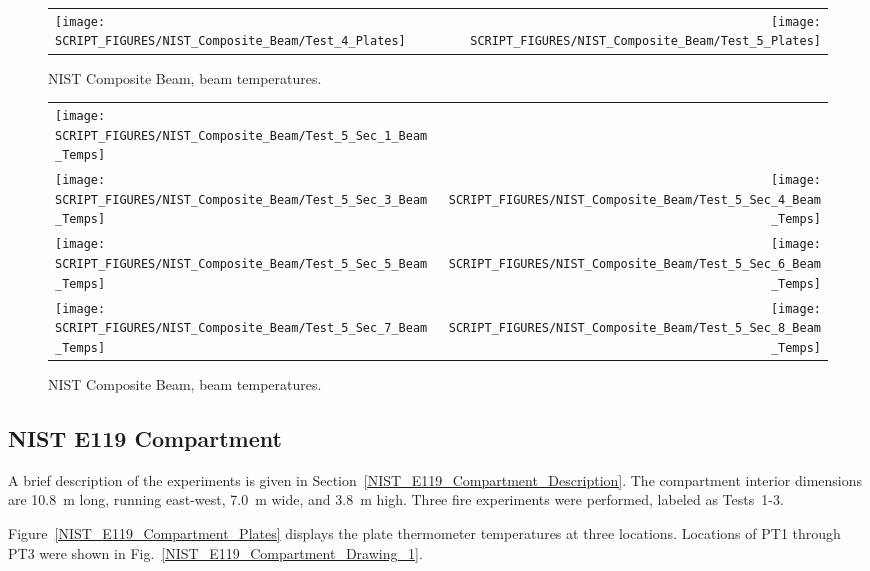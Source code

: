 \begin{figure}[!h]
\begin{tabular*}{\textwidth}{l@{\extracolsep{\fill}}r}
\texttt{[image: SCRIPT\_FIGURES/NIST\_Composite\_Beam/Test\_4\_Plates]} &
\texttt{[image: SCRIPT\_FIGURES/NIST\_Composite\_Beam/Test\_5\_Plates]}
\end{tabular*}
\caption[NIST Composite Beam, beam temperatures]{NIST Composite Beam, beam temperatures.}
\label{NIST_CB_Plates}
\end{figure}

\newpage

\begin{figure}[p]
\begin{tabular*}{\textwidth}{l@{\extracolsep{\fill}}r}
\texttt{[image: SCRIPT\_FIGURES/NIST\_Composite\_Beam/Test\_5\_Sec\_1\_Beam\_Temps]} &
 \\
\texttt{[image: SCRIPT\_FIGURES/NIST\_Composite\_Beam/Test\_5\_Sec\_3\_Beam\_Temps]} &
\texttt{[image: SCRIPT\_FIGURES/NIST\_Composite\_Beam/Test\_5\_Sec\_4\_Beam\_Temps]} \\
\texttt{[image: SCRIPT\_FIGURES/NIST\_Composite\_Beam/Test\_5\_Sec\_5\_Beam\_Temps]} &
\texttt{[image: SCRIPT\_FIGURES/NIST\_Composite\_Beam/Test\_5\_Sec\_6\_Beam\_Temps]} \\
\texttt{[image: SCRIPT\_FIGURES/NIST\_Composite\_Beam/Test\_5\_Sec\_7\_Beam\_Temps]} &
\texttt{[image: SCRIPT\_FIGURES/NIST\_Composite\_Beam/Test\_5\_Sec\_8\_Beam\_Temps]}
\end{tabular*}
\caption[NIST Composite Beam, beam temperatures]{NIST Composite Beam, beam temperatures.}
\label{NIST_CB_Beam}
\end{figure}



\clearpage

\subsection{NIST E119 Compartment}

A brief description of the experiments is given in Section~\ref{NIST_E119_Compartment_Description}. The compartment interior dimensions are 10.8~m long, running east-west, 7.0~m wide, and 3.8~m high. Three fire experiments were performed, labeled as Tests~1-3.

Figure~\ref{NIST_E119_Compartment_Plates} displays the plate thermometer temperatures at three locations.  Locations of PT1 through PT3 were shown in Fig.~\ref{NIST_E119_Compartment_Drawing_1}.

